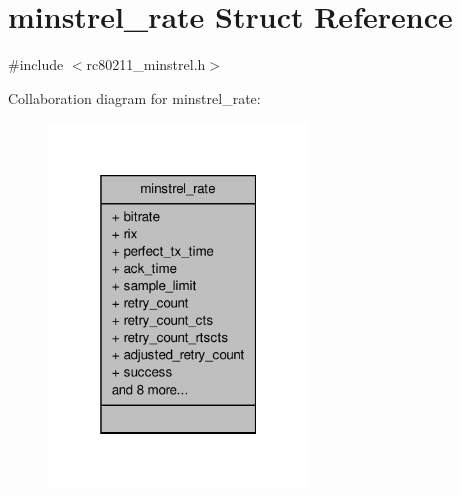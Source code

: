 \hypertarget{structminstrel__rate}{\section{minstrel\-\_\-rate Struct Reference}
\label{structminstrel__rate}
}


{\ttfamily \#include $<$rc80211\-\_\-minstrel.\-h$>$}



Collaboration diagram for minstrel\-\_\-rate\-:
\nopagebreak
\begin{figure}[H]
\begin{center}
\leavevmode
\includegraphics[width=196pt]{structminstrel__rate__coll__graph}
\end{center}
\end{figure}
